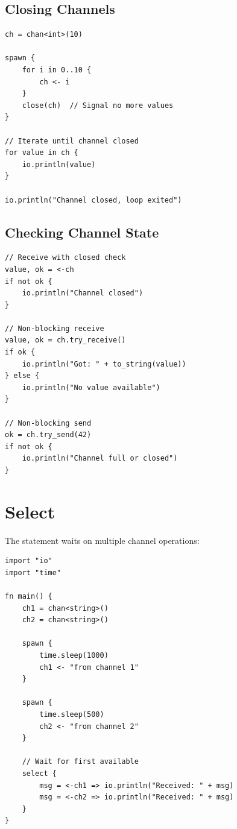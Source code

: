 \subsection{Closing Channels}

\begin{lstlisting}
ch = chan<int>(10)

spawn {
    for i in 0..10 {
        ch <- i
    }
    close(ch)  // Signal no more values
}

// Iterate until channel closed
for value in ch {
    io.println(value)
}

io.println("Channel closed, loop exited")
\end{lstlisting}

\subsection{Checking Channel State}

\begin{lstlisting}
// Receive with closed check
value, ok = <-ch
if not ok {
    io.println("Channel closed")
}

// Non-blocking receive
value, ok = ch.try_receive()
if ok {
    io.println("Got: " + to_string(value))
} else {
    io.println("No value available")
}

// Non-blocking send
ok = ch.try_send(42)
if not ok {
    io.println("Channel full or closed")
}
\end{lstlisting}

\section{Select}

The  statement waits on multiple channel operations:

\begin{lstlisting}
import "io"
import "time"

fn main() {
    ch1 = chan<string>()
    ch2 = chan<string>()

    spawn {
        time.sleep(1000)
        ch1 <- "from channel 1"
    }

    spawn {
        time.sleep(500)
        ch2 <- "from channel 2"
    }

    // Wait for first available
    select {
        msg = <-ch1 => io.println("Received: " + msg)
        msg = <-ch2 => io.println("Received: " + msg)
    }
}
\end{lstlisting}

